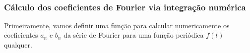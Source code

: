 \documentclass[11pt]{article}
\begin{document}
    \begin{center}
    \end{center}
    { \hspace*{\fill} \\}
    
    \hypertarget{cuxe1lculo-dos-coeficientes-de-fourier-via-integrauxe7uxe3o-numuxe9rica}{%
\subsubsection{Cálculo dos coeficientes de Fourier via integração
numérica}\label{cuxe1lculo-dos-coeficientes-de-fourier-via-integrauxe7uxe3o-numuxe9rica}}

Primeiramente, vamos definir uma função para calcular numericamente os
coeficientes \(a_n\) e \(b_n\) da série de Fourier para uma função
periódica \(f(t)\) qualquer.
\end{document}
